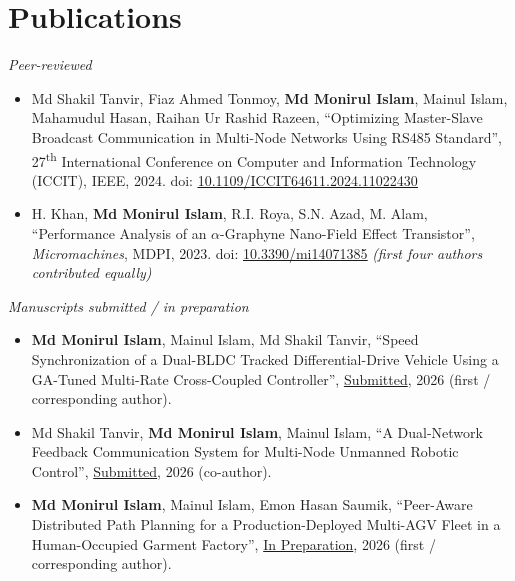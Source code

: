 \documentclass[a4paper,20pt]{article}
\begin{document}
\section{\textbf{Publications}}
{\small \textit{Peer-reviewed}}
\begin{itemize}[leftmargin=*, itemsep=3.5pt, parsep=0pt, topsep=3pt]

\item Md Shakil Tanvir, Fiaz Ahmed Tonmoy, \textbf{Md Monirul Islam}, Mainul Islam, Mahamudul Hasan, Raihan Ur Rashid Razeen, ``Optimizing Master-Slave Broadcast Communication in Multi-Node Networks Using RS485 Standard'', 27\textsuperscript{th} International Conference on Computer and Information Technology (ICCIT), IEEE, 2024. doi: \href{https://doi.org/10.1109/ICCIT64611.2024.11022430}{\underline{10.1109/ICCIT64611.2024.11022430}}
\vspace{-1pt}

\item H. Khan, \textbf{Md Monirul Islam}, R.I. Roya, S.N. Azad, M. Alam, ``Performance Analysis of an \(\alpha\)-Graphyne Nano-Field Effect Transistor'', \textit{Micromachines}, MDPI, 2023. doi: \href{https://doi.org/10.3390/mi14071385}{\underline{10.3390/mi14071385}} \textit{(first four authors contributed equally)}

\end{itemize}
\vspace{-2pt}
{\small \textit{Manuscripts submitted / in preparation}}
\begin{itemize}[leftmargin=*, itemsep=3.5pt, parsep=0pt, topsep=3pt]

\item \textbf{Md Monirul Islam}, Mainul Islam, Md Shakil Tanvir, ``Speed Synchronization of a Dual-BLDC Tracked Differential-Drive Vehicle Using a GA-Tuned Multi-Rate Cross-Coupled Controller'', \underline{Submitted}, 2026 (first / corresponding author).
\vspace{-1pt}

\item Md Shakil Tanvir, \textbf{Md Monirul Islam}, Mainul Islam, ``A Dual-Network Feedback Communication System for Multi-Node Unmanned Robotic Control'', \underline{Submitted}, 2026 (co-author).
\vspace{-1pt}

\item \textbf{Md Monirul Islam}, Mainul Islam, Emon Hasan Saumik, ``Peer-Aware Distributed Path Planning for a Production-Deployed Multi-AGV Fleet in a Human-Occupied Garment Factory'', \underline{In Preparation}, 2026 (first / corresponding author).

\end{itemize}
\end{document}
